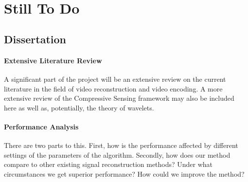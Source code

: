 \chapter{Still To Do}

\section{Dissertation}
\subsubsection{Extensive Literature Review}
A significant part of the project will be an extensive review on the current literature in the field of video reconstruction and video encoding.
A more extensive review of the Compressive Sensing framework may also be included here as well as, potentially, the theory of wavelets. 


\subsubsection{Performance Analysis}
There are two parts to this. First, how is the performance affected by different settings of the parameters of the algorithm.
Secondly, how does our method compare to other existing signal reconstruction methods? Under what circumstances we get superior performance? How could we improve the method?

